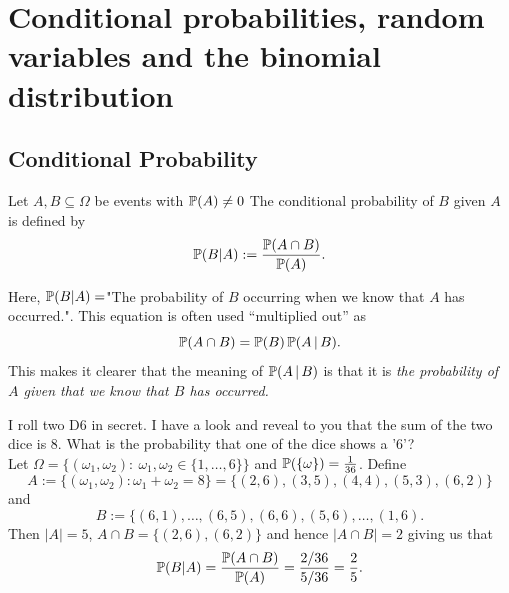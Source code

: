 \section{Conditional probabilities, random variables and the binomial distribution}

\subsection{Conditional Probability}
\begin{defn}
Let $A, B \subseteq \Omega$ be events with ${\mathbb P}(A) \not=0$ The conditional probability of $B$ given $A$ is defined by
\[{\mathbb P}(B \vert A) := \frac{{\mathbb P}(A \cap B)}{{\mathbb P}(A)}.\]
\end{defn}
\noindent Here, ${\mathbb P}( B \vert A)=$"The probability of $B$ occurring when we know that $A$ has occurred.". This equation is often used ``multiplied out'' as
\[{\mathbb P}(A \cap B) = {\mathbb P}(B) \, {\mathbb P}(A \, | \, B). \]
This makes it clearer that the meaning of ${\mathbb P}(A \, | \, B)$ is that it is \emph{the probability of $A$ given that we know that $B$ has occurred.}
\begin{example}
I roll two D6 in secret. I have a look and reveal to you that the sum of the two dice is $8$. What is the probability that one of the dice shows a '$6$'?\\ \linebreak
Let $\Omega = \{ (\omega_1,\omega_2):\ \omega_1,\omega_2 \in \{1, \ldots, 6 \}\}$ and ${\mathbb P}(\{\omega\}) = \frac{1}{36}$. Define 
\[A:=\{ (\omega_1,\omega_2): \omega_1+ \omega_2 = 8 \} = \{ (2,6),(3,5), (4,4), (5,3), (6,2)\}\]
and 
\[B:=\{ (6,1),\ldots,(6,5),(6,6),(5,6),\ldots,(1,6).\]
\linebreak\noindent Then $\vert A \vert =5$, $A \cap B= \{ (2,6),(6,2)\}$ and hence $\vert A \cap B \vert = 2$ giving us that
\[ {\mathbb P}(B \vert A) = \frac{{\mathbb P}(A \cap B)}{{\mathbb P}(A)} = \frac{ 2/36}{5/36} = \frac25.\]
\end{example}

